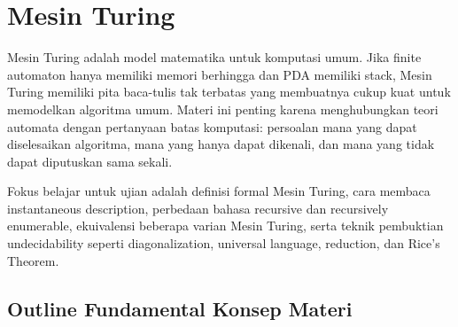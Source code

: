 \section{Mesin Turing}

Mesin Turing adalah model matematika untuk komputasi umum. Jika finite automaton hanya memiliki memori berhingga dan PDA memiliki stack, Mesin Turing memiliki pita baca-tulis tak terbatas yang membuatnya cukup kuat untuk memodelkan algoritma umum. Materi ini penting karena menghubungkan teori automata dengan pertanyaan batas komputasi: persoalan mana yang dapat diselesaikan algoritma, mana yang hanya dapat dikenali, dan mana yang tidak dapat diputuskan sama sekali.

Fokus belajar untuk ujian adalah definisi formal Mesin Turing, cara membaca instantaneous description, perbedaan bahasa recursive dan recursively enumerable, ekuivalensi beberapa varian Mesin Turing, serta teknik pembuktian undecidability seperti diagonalization, universal language, reduction, dan Rice's Theorem.

\subsection{Outline Fundamental Konsep Materi}

